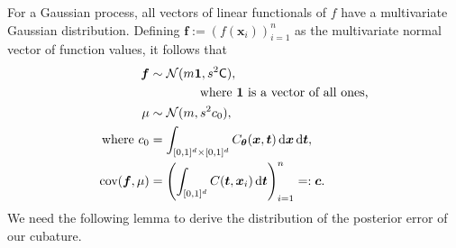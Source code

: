 \documentclass[twocolumn]{svjour3}          %
\newcommand{\bm}[1]{\boldsymbol{#1}}
\newcommand{\dif}[1]{\text{d}{#1}}
\newcommand{\D}[1]{\text{d}{#1}}
\newcommand{\vtheta}{{\bm{\theta}}}
\newcommand{\vc}{\bm{c}}
\newcommand{\vf}{\bm{f}}
\newcommand{\vt}{\bm{t}}
\newcommand{\vx}{\bm{x}}
\newcommand{\vone}{\bm{1}}
\newcommand{\mC}{\mathsf{C}}
\newcommand{\cov}{{\textup{cov}}}
\newcommand{\calN}{\mathcal{N}}
\begin{document}
For a Gaussian process, all vectors of linear functionals of $f$ have a multivariate Gaussian distribution. Defining  $\vf  := \left( f(\vx_i)\right)_{i=1}^n$ as the multivariate normal vector of function values, it follows that 
\begin{subequations} \label{eqn:fGaussDist}
\begin{align}
\vf  & \sim \calN(m \vone, s^2 \mC), \\
\nonumber & \qquad \qquad \text{where $\vone$ is a vector of all ones,}\\
\mu & \sim \calN(m, s^2 c_0), 
\\
\text{where }
c_0 &= \int_{[0,1]^{d}\times [0,1]^{d}} C_\vtheta(\vx,\vt) \, \dif{\vx} \, \dif{\vt}, \\
\cov(\vf, \mu) &= \left(  \int_{[0,1]^d} C(\vt,\vx_i) \, \D \vt \right)_{i=1}^n  =: \vc.
\end{align}
\end{subequations}
We need the following lemma to derive the distribution of the posterior error of our cubature. 
\end{document}

